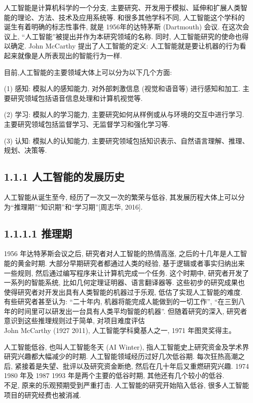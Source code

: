 \documentclass[10pt]{article}
\begin{document}
人工智能是计算机科学的一个分支, 主要研究、开发用于模拟、延伸和扩展人类智能的理论、方法、技术及应用系统等. 和很多其他学科不同, 人工智能这个学科的诞生有着明确的标志性事件, 就是 1956年的达特茅斯 (Dartmouth) 会议. 在这次会议上, “人工智能”被提出并作为本研究领域的名称. 同时, 人工智能研究的使命也得以确定. John McCarthy 提出了人工智能的定义: 人工智能就是要让机器的行为看起来就像是人所表现出的智能行为一样.

目前,人工智能的主要领域大体上可以分为以下几个方面:

(1) 感知: 模拟人的感知能力, 对外部刺激信息 (视觉和语音等) 进行感知和加工. 主要研究领域包括语音信息处理和计算机视觉等.

(2) 学习: 模拟人的学习能力, 主要研究如何从样例或从与环境的交互中进行学习. 主要研究领域包括监督学习、无监督学习和强化学习等.

(3) 认知: 模拟人的认知能力, 主要研究领域包括知识表示、自然语言理解、推理、规划、决策等.

\subsection*{1.1.1 人工智能的发展历史}
人工智能从诞生至今, 经历了一次又一次的繁荣与低谷, 其发展历程大体上可以分为“推理期”“知识期”和“学习期”[周志华, 2016].

\subsection*{1.1.1.1 推理期}
1956 年达特茅斯会议之后, 研究者对人工智能的热情高涨, 之后的十几年是人工智能的黄金时期. 大部分早期研究者都通过人类的经验, 基于逻辑或者事实归纳出来一些规则, 然后通过编写程序来让计算机完成一个任务. 这个时期中, 研究者开发了一系列的智能系统, 比如几何定理证明器、语言翻译器等. 这些初步的研究成果也使得研究者对开发出具有人类智能的机器过于乐观, 低估了实现人工智能的难度. 有些研究者甚至认为: “二十年内, 机器将能完成人能做到的一切工作”, “在三到八年的时间里可以研发出一台具有人类平均智能的机器”. 但随着研究的深入, 研究者意识到这些推理规则过于简单, 对项目难度评估\\
John McCarthy (1927 2011), 人工智能学科奠基人之一, 1971 年图灵奖得主。

人工智能低谷, 也叫人工智能冬天 (AI Winter), 指人工智能史上研究资金及学术界研究兴趣都大幅减少的时期. 人工智能领域经历过好几次低谷期. 每次狂热高潮之后, 紧接着是失望、批评以及研究资金断绝, 然后在几十年后又重燃研究兴趣. 1974 1980 年及 1987 1993 年是两个主要的低谷时期, 其他还有几个较小的低谷.\\
不足, 原来的乐观预期受到严重打击. 人工智能的研究开始陷入低谷, 很多人工智能项目的研究经费也被消减.
\end{document}
